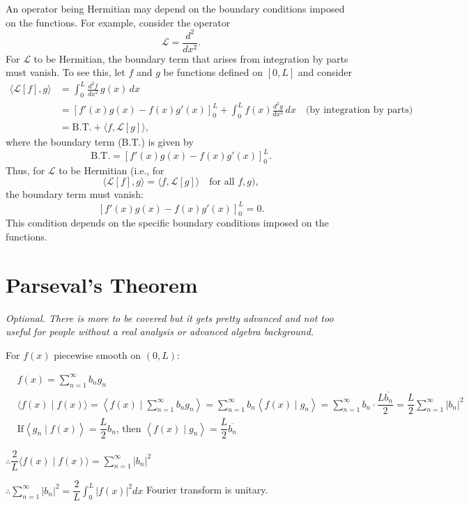 \documentclass{report}
\begin{document}
An operator being Hermitian may depend on the boundary conditions imposed on the functions. For example, consider the operator
\[
\mathcal{L} = \frac{d^2}{dx^2}.
\]
For \(\mathcal{L}\) to be Hermitian, the boundary term that arises from integration by parts must vanish. To see this, let \(f\) and \(g\) be functions defined on \([0,L]\) and consider
\begin{align*}
\langle \mathcal{L}[f], g \rangle &= \int_0^L \frac{d^2 f}{dx^2}\, g(x)\, dx \\
&= \left[ f'(x) g(x) - f(x) g'(x) \right]_{0}^{L} + \int_0^L f(x) \frac{d^2 g}{dx^2}\, dx \quad \text{(by integration by parts)} \\
&= \text{B.T.} + \langle f, \mathcal{L}[g] \rangle,
\end{align*}
where the boundary term (B.T.) is given by
\[
\text{B.T.} = \left[ f'(x) g(x) - f(x) g'(x) \right]_{0}^{L}.
\]
Thus, for \(\mathcal{L}\) to be Hermitian (i.e., for
\[
\langle \mathcal{L}[f], g \rangle = \langle f, \mathcal{L}[g] \rangle \quad \text{for all } f, g),
\]
the boundary term must vanish:
\[
\left[ f'(x) g(x) - f(x) g'(x) \right]_{0}^{L} = 0.
\]
This condition depends on the specific boundary conditions imposed on the functions.


\section{Parseval's Theorem}

\emph{Optional. There is more to be covered but it gets pretty advanced and not too useful for people without a real analysis or advanced algebra background.}

For $f(x)$ piecewise smooth on $(0, L)$:

$
\begin{aligned}
& f(x)=\sum\limits_{n=1}^{\infty} b_{n} g_{n} \\
& \langle f(x) \mid f(x)\rangle=\left\langle f(x) \mid \sum\limits_{n=1}^{\infty} b_{n} g_{n}\right\rangle=\sum\limits_{n=1}^{\infty} b_{n}\left\langle f(x) \mid g_{n}\right\rangle=\sum\limits_{n=1}^{\infty} b_{n} \cdot \dfrac{L \overline{b_{n}}}{2}=\dfrac{L}{2} \sum\limits_{n=1}^{\infty}\left|b_{n}\right|^{2} \\
& \text{If} \left\langle g_{n} \mid f(x)\right\rangle=\dfrac{L}{2} b_{n} \text {, then }\left\langle f(x) \mid g_{n}\right\rangle=\dfrac{L}{2} \overline{b_{n}}
\end{aligned}
$

$\therefore \dfrac{2}{L}\langle f(x) \mid f(x)\rangle=\sum\limits_{n=1}^{\infty}\left|b_{n}\right|^{2}$

$\therefore \sum\limits_{n=1}^{\infty}\left|b_{n}\right|^{2}=\dfrac{2}{L} \displaystyle\int_{0}^{L}|f(x)|^{2} d x$ \quad Fourier transform is unitary.
\end{document}
